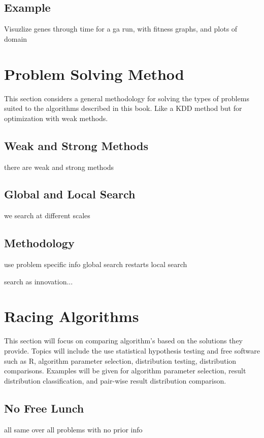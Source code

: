 \subsection{Example}
Visuzlize genes through time for a ga run, with fitness graphs, and plots of domain


% 
% 
\section{Problem Solving Method}
\label{advanced:sec:method}
This section considers a general methodology for solving the types of problems suited to the algorithms described in this book. Like a KDD method but for optimization with weak methods.

\subsection{Weak and Strong Methods}
there are weak and strong methods

\subsection{Global and Local Search}
we search at different scales

\subsection{Methodology}
use problem specific info
global search
restarts
local search

search as innovation...


% 
% 
\section{Racing Algorithms}
\label{advanced:sec:comparing}
This section will focus on comparing algorithm's based on the solutions they provide. Topics will include the use statistical hypothesis testing and free software such as R, algorithm parameter selection, distribution testing, distribution comparisons. Examples will be given for algorithm parameter selection, result distribution classification, and pair-wise result distribution comparison.

\subsection{No Free Lunch}
all same over all problems with no prior info

